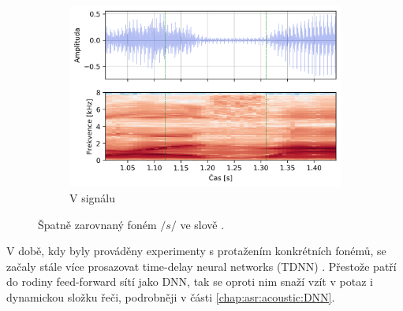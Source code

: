 \begin{figure}[htpb]
\begin{subfigure}[b]{0.65\textwidth}
    \includegraphics[width=\textwidth]{./ch6-realisation/img/energy_spec_word-segment.png}
    \caption{V signálu}
    \label{fig:realisation:augmentation:alignemnt:wrong:audio}
  \end{subfigure}
  \caption{Špatně zarovnaný foném $/s/$ ve slově .}
  \label{fig:realisation:augmentation:alignemnt:wrong}
\end{figure}


\noindent V době, kdy byly prováděny experimenty s protažením konkrétních fonémů, se začaly stále více prosazovat time-delay neural networks (TDNN) .
Přestože patří do rodiny feed-forward sítí jako DNN, tak se oproti nim snaží vzít v potaz i dynamickou složku řeči, podrobněji v části \ref{chap:asr:acoustic:DNN}.


